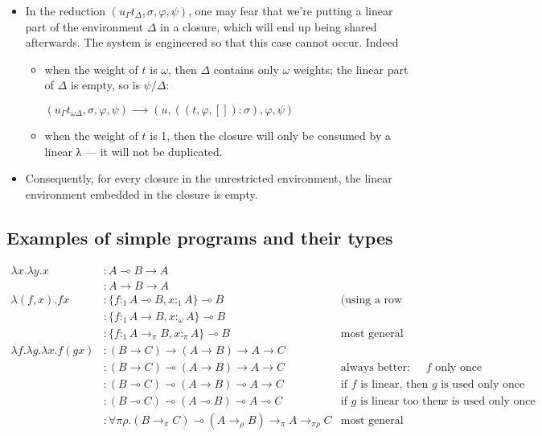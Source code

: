 \documentclass[11pt]{article}
\begin{document}
\begin{itemize}
\item In the reduction \((u_Γ t_Δ,σ,φ,ψ)\), one may fear that we're
putting a linear part of the environment \(Δ\) in a closure, which will
end up being shared afterwards. The system is engineered so that
this case cannot occur. Indeed
\begin{itemize}
\item when the weight of \(t\) is \(ω\), then \(Δ\) contains only \(ω\) weights; the
linear part of \(Δ\) is empty, so is \(ψ/Δ\):

\((u_Γ t_{ωΔ},σ,φ,ψ)          ⟶ (u,((t,φ,[]):σ),φ,ψ)\)

\item when the weight of \(t\) is 1, then the closure will only be consumed
by a linear λ --- it will not be duplicated.
\end{itemize}

\item Consequently, for every closure in the unrestricted environment, the
linear environment embedded in the closure is empty.
\end{itemize}


\subsection{Examples of simple programs and their types}

\begin{align*}
λx. λy. x & : A ⊸ B → A \\
          & : A → B → A \\
λ(f,x). f x & : \{f :_1 A ⊸ B, x :_1 A\} ⊸ B & \text{(using a row type for concision)}\\
            & : \{f :_1 A → B, x :_ω A\} ⊸ B \\
            & : \{f :_1 A →_π B, x :_π A\} ⊸ B & \text{most general type} \\ 
λf. λg. λx. f (g x) & : (B → C) → (A → B) → A → C \\
                    & : (B → C) ⊸ (A → B) → A → C & \text {always better: comp uses $f$  only once} \\
                    & : (B ⊸ C) ⊸ (A → B) ⊸ A → C & \text {if $f$ is linear, then $g$ is used only once} \\
                    & : (B ⊸ C) ⊸ (A ⊸ B) ⊸ A ⊸ C & \text {if $g$ is linear too then $x$ is used only once} \\
                    & : ∀ π ρ. (B →_π C) ⊸ (A →_ρ B) →_π A →_{πρ} C & \text{most general type} \\
\end{align*}
\end{document}

